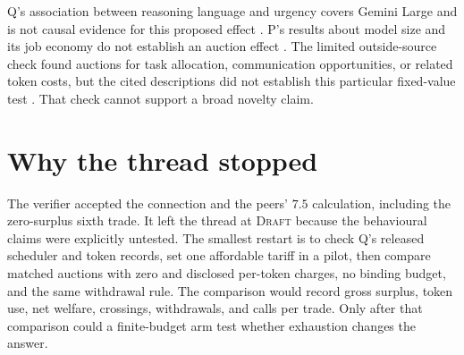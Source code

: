 \documentclass{article}
\begin{document}
Q's association between reasoning language and urgency covers Gemini Large and is not causal
evidence for this proposed effect \cite{Q}. P's results about model size and its job economy do not
establish an auction effect \cite{P}. The limited outside-source check found auctions for task
allocation, communication opportunities, or related token costs, but the cited descriptions did not
establish this particular fixed-value test \cite{Agora,DALA,Bandwidth,TokenStudy}. That check cannot
support a broad novelty claim.

\section{Why the thread stopped}

The verifier accepted the connection and the peers' \(7.5\) calculation, including the zero-surplus
sixth trade. It left the thread at \textsc{Draft} because the behavioural claims were explicitly
untested. The smallest restart is to check Q's released scheduler and token records, set one
affordable tariff in a pilot, then compare matched auctions with zero and disclosed per-token
charges, no binding budget, and the same withdrawal rule. The comparison would record gross surplus,
token use, net welfare, crossings, withdrawals, and calls per trade. Only after that comparison
could a finite-budget arm test whether exhaustion changes the answer.



\end{document}

